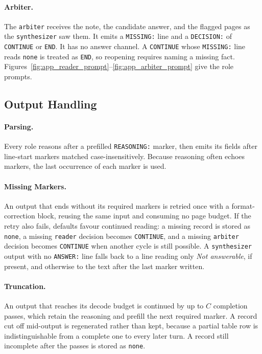 \paragraph{Arbiter.}
The \texttt{arbiter} receives the note, the candidate answer, and the flagged pages as the \texttt{synthesizer} saw them. It emits a \texttt{MISSING:} line and a \texttt{DECISION:} of \texttt{CONTINUE} or \texttt{END}. It has no answer channel. A \texttt{CONTINUE} whose \texttt{MISSING:} line reads \texttt{none} is treated as \texttt{END}, so reopening requires naming a missing fact.
Figures~\ref{fig:app_reader_prompt}--\ref{fig:app_arbiter_prompt} give the role prompts.

\subsection{Output Handling}
\label{app:output_handling}

\paragraph{Parsing.}
Every role reasons after a prefilled \texttt{REASONING:} marker, then emits its fields after line-start markers matched case-insensitively. Because reasoning often echoes markers, the last occurrence of each marker is used.

\paragraph{Missing Markers.}
An output that ends without its required markers is retried once with a format-correction block, reusing the same input and consuming no page budget. If the retry also fails, defaults favour continued reading: a missing record is stored as \texttt{none}, a missing \texttt{reader} decision becomes \texttt{CONTINUE}, and a missing \texttt{arbiter} decision becomes \texttt{CONTINUE} when another cycle is still possible. A \texttt{synthesizer} output with no \texttt{ANSWER:} line falls back to a line reading only \emph{Not answerable}, if present, and otherwise to the text after the last marker written.

\paragraph{Truncation.}
An output that reaches its decode budget is continued by up to $C$ completion passes, which retain the reasoning and prefill the next required marker. A record cut off mid-output is regenerated rather than kept, because a partial table row is indistinguishable from a complete one to every later turn. A record still incomplete after the passes is stored as \texttt{none}.

